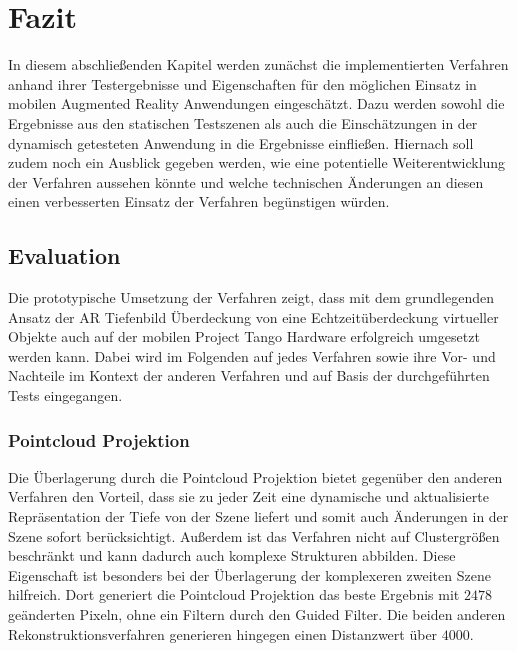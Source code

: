 \chapter{Fazit} \label{sec:conclusion}

In diesem abschließenden Kapitel werden zunächst die implementierten Verfahren anhand ihrer Testergebnisse und Eigenschaften für den möglichen Einsatz in mobilen Augmented Reality Anwendungen eingeschätzt. Dazu werden sowohl die Ergebnisse aus den statischen Testszenen als auch die Einschätzungen in der dynamisch getesteten Anwendung in die Ergebnisse einfließen. Hiernach soll zudem noch ein Ausblick gegeben werden, wie eine potentielle Weiterentwicklung der Verfahren aussehen könnte und welche technischen Änderungen an diesen einen verbesserten Einsatz der Verfahren begünstigen würden.

\section{Evaluation}

Die prototypische Umsetzung der Verfahren zeigt, dass mit dem grundlegenden Ansatz der AR Tiefenbild Überdeckung von \citet{wloka1995resolving} eine Echtzeitüberdeckung virtueller Objekte auch auf der mobilen Project Tango Hardware erfolgreich umgesetzt werden kann. Dabei wird im Folgenden auf jedes Verfahren sowie ihre Vor- und Nachteile im Kontext der anderen Verfahren und auf Basis der durchgeführten Tests eingegangen. 

\subsection*{Pointcloud Projektion}

Die Überlagerung durch die Pointcloud Projektion bietet gegenüber den anderen Verfahren den Vorteil, dass sie zu jeder Zeit eine dynamische und aktualisierte Repräsentation der Tiefe von der Szene liefert und somit auch Änderungen in der Szene sofort berücksichtigt. Außerdem ist das Verfahren nicht auf Clustergrößen beschränkt und kann dadurch auch komplexe Strukturen abbilden. Diese Eigenschaft ist besonders bei der Überlagerung der komplexeren zweiten Szene hilfreich. Dort generiert die Pointcloud Projektion das beste Ergebnis mit \(2478\) geänderten Pixeln, ohne ein Filtern durch den Guided Filter. Die beiden anderen Rekonstruktionsverfahren generieren hingegen einen Distanzwert über \(4000\).

